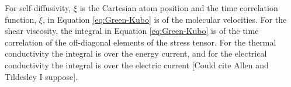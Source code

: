\documentclass[9pt]{livecoms}
\begin{document}
For self-diffusivity, $\xi$ is the Cartesian atom position and the time correlation function, $\dot{\xi}$, in Equation \ref{eq:Green-Kubo} is of the molecular velocities. For the shear viscosity, the integral in Equation \ref{eq:Green-Kubo} is of the time correlation of the off-diagonal elements of the stress tensor. For the thermal conductivity the integral is over the energy current, and for the electrical conductivity the integral is over the electric current [Could cite Allen and Tildesley I suppose].


%	
\end{document}
